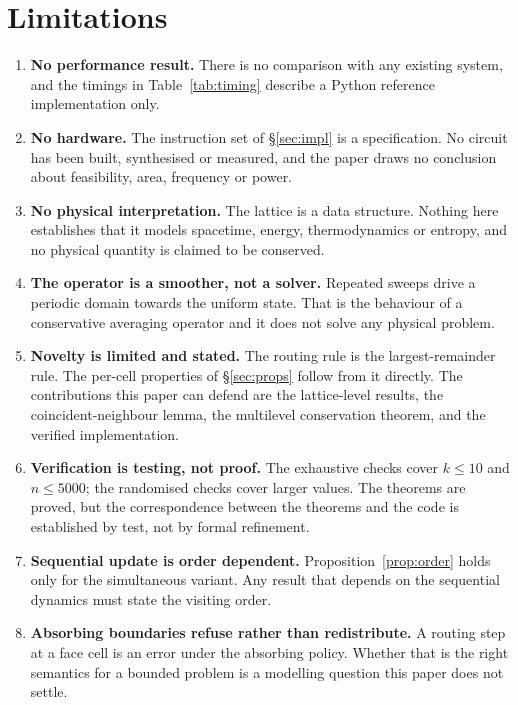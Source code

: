 \documentclass[11pt,a4paper]{article}
\theoremstyle{definition}
\begin{document}
\section{Limitations}\label{sec:limits}

\begin{enumerate}[leftmargin=1.4em]
\item \textbf{No performance result.} There is no comparison with any existing
system, and the timings in Table~\ref{tab:timing} describe a Python reference
implementation only.

\item \textbf{No hardware.} The instruction set of \S\ref{sec:impl} is a
specification. No circuit has been built, synthesised or measured, and the
paper draws no conclusion about feasibility, area, frequency or power.

\item \textbf{No physical interpretation.} The lattice is a data structure.
Nothing here establishes that it models spacetime, energy, thermodynamics or
entropy, and no physical quantity is claimed to be conserved.

\item \textbf{The operator is a smoother, not a solver.} Repeated sweeps drive
a periodic domain towards the uniform state. That is the behaviour of a
conservative averaging operator and it does not solve any physical problem.

\item \textbf{Novelty is limited and stated.} The routing rule is the
largest-remainder rule. The per-cell properties of \S\ref{sec:props} follow
from it directly. The contributions this paper can defend are the lattice-level
results, the coincident-neighbour lemma, the multilevel conservation theorem,
and the verified implementation.

\item \textbf{Verification is testing, not proof.} The exhaustive checks cover
$k \leq 10$ and $n \leq 5000$; the randomised checks cover larger values. The
theorems are proved, but the correspondence between the theorems and the code is
established by test, not by formal refinement.

\item \textbf{Sequential update is order dependent.} Proposition~\ref{prop:order}
holds only for the simultaneous variant. Any result that depends on the
sequential dynamics must state the visiting order.

\item \textbf{Absorbing boundaries refuse rather than redistribute.} A routing
step at a face cell is an error under the absorbing policy. Whether that is the
right semantics for a bounded problem is a modelling question this paper does
not settle.
\end{enumerate}
\end{document}

